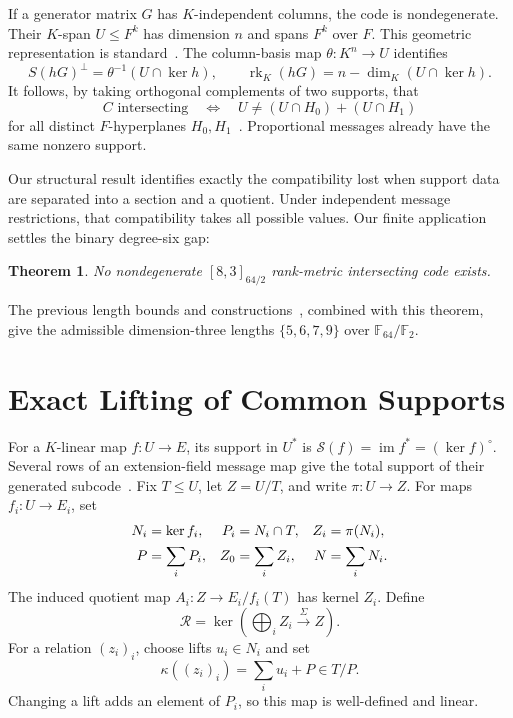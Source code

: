 \documentclass[12pt,letterpaper,onecolumn]{article}
\newcommand{\F}{\mathbb F}
\newtheorem{theorem}{Theorem}
\theoremstyle{definition}
\begin{document}
If a generator matrix $G$ has $K$-independent columns, the code is nondegenerate. Their $K$-span $U\le F^k$ has dimension $n$ and spans $F^k$ over $F$. This geometric representation is standard~\cite{randrianarisoa2020,alfarano2022}. The column-basis map $\theta:K^n\to U$ identifies
\begin{equation}
 S(hG)^\perp=\theta^{-1}(U\cap\ker h),\qquad
 \operatorname{rk}_K(hG)=n-\dim_K(U\cap\ker h).
 \label{eq:support-kernel}
\end{equation}
It follows, by taking orthogonal complements of two supports, that
\begin{equation}
 C\text{ intersecting}\quad\Longleftrightarrow\quad
 U\ne(U\cap H_0)+(U\cap H_1)
 \label{eq:two-span}
\end{equation}
for all distinct $F$-hyperplanes $H_0,H_1$~\cite{bbms2025}. Proportional messages already have the same nonzero support.

Our structural result identifies exactly the compatibility lost when support data are separated into a section and a quotient. Under independent message restrictions, that compatibility takes all possible values. Our finite application settles the binary degree-six gap:
\begin{theorem}\label{thm:binary}
No nondegenerate $[8,3]_{64/2}$ rank-metric intersecting code exists.
\end{theorem}
The previous length bounds and constructions~\cite[Remark 4.5]{bpz2026}, combined with this theorem, give the admissible dimension-three lengths $\{5,6,7,9\}$ over $\F_{64}/\F_2$.

\section{Exact Lifting of Common Supports}
For a $K$-linear map $f:U\to E$, its support in $U^*$ is $\mathcal S(f)=\operatorname{im}f^*=(\ker f)^\circ$. Several rows of an extension-field message map give the total support of their generated subcode~\cite{gorla2020}. Fix $T\le U$, let $Z=U/T$, and write $\pi:U\to Z$. For maps $f_i:U\to E_i$, set
\begin{align}
 N_i&=\ker f_i,&P_i&=N_i\cap T,&Z_i&=\pi(N_i),\notag\\
 P&=\sum_iP_i,&Z_0&=\sum_iZ_i,&N&=\sum_iN_i.\notag
\end{align}
The induced quotient map $A_i:Z\to E_i/f_i(T)$ has kernel $Z_i$. Define
\begin{equation}
 \mathcal R=\ker\left(\bigoplus_i Z_i\xrightarrow{\Sigma}Z\right).
 \label{eq:relation}
\end{equation}
For a relation $(z_i)_i$, choose lifts $u_i\in N_i$ and set
\begin{equation}
 \kappa((z_i)_i)=\sum_i u_i+P\in T/P.
 \label{eq:kappa}
\end{equation}
Changing a lift adds an element of $P_i$, so this map is well-defined and linear.
\end{document}
